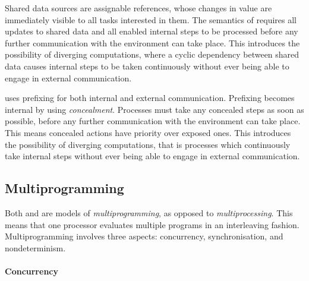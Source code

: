 Shared data sources are assignable references, whose changes in value are immediately visible to all tasks interested in them.
The semantics of \TOPHAT requires all updates to shared data and all enabled internal steps to be processed before any further communication with the environment can take place.
This introduces the possibility of diverging computations, where a cyclic dependency between shared data causes internal steps to be taken continuously without ever being able to engage in external communication.

\CSP uses prefixing for both internal and external communication.
Prefixing becomes internal by using \emph{concealment}.
Processes must take any concealed steps as soon as possible, before any further communication with the environment can take place.
This means concealed actions have priority over exposed ones.
This introduces the possibility of diverging computations, that is processes which continuously take internal steps without ever being able to engage in external communication.







\subsection{Multiprogramming}

Both \TOP and \CSP are models of \emph{multiprogramming}, as opposed to \emph{multiprocessing}.
This means that one processor evaluates multiple programs in an interleaving fashion.
Multiprogramming involves three aspects: concurrency, synchronisation, and nondeterminism.



\paragraph{Concurrency}

